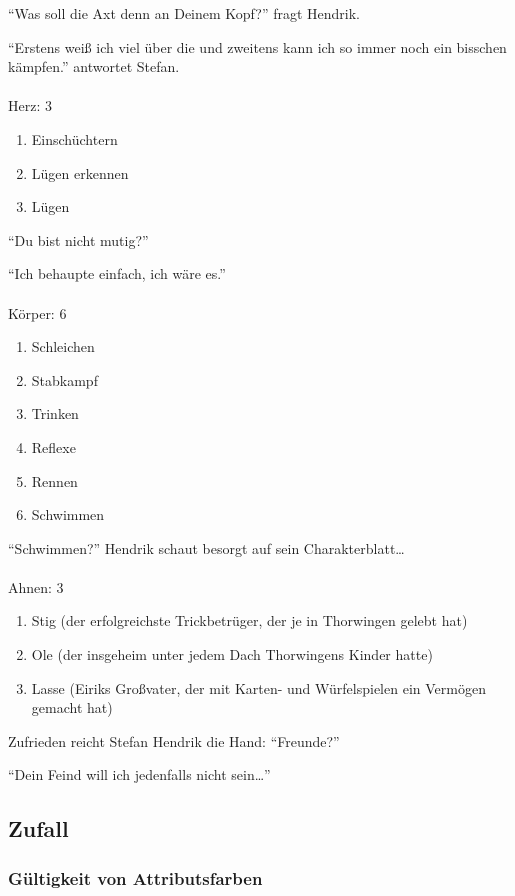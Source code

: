 "`Was soll die Axt denn an Deinem Kopf?"' fragt Hendrik. 

"`Erstens weiß ich viel über die und zweitens kann ich so immer noch ein bisschen kämpfen."' antwortet Stefan.
\\
\\
Herz: 3
\begin {enumerate}
\item Einschüchtern
\item Lügen erkennen
\item Lügen
\end {enumerate}

"`Du bist nicht mutig?"' 

"`Ich behaupte einfach, ich wäre es."'
\\
\\
Körper: 6
\begin {enumerate}
\item Schleichen
\item Stabkampf
\item Trinken
\item Reflexe
\item Rennen
\item Schwimmen
\end {enumerate}

"`Schwimmen?"' Hendrik schaut besorgt auf sein Charakterblatt\dots
\\
\\
Ahnen: 3
\begin {enumerate}
\item Stig (der erfolgreichste Trickbetrüger, der je in Thorwingen gelebt hat)
\item Ole (der insgeheim unter jedem Dach Thorwingens Kinder hatte)
\item Lasse (Eiriks Großvater, der mit Karten- und Würfelspielen ein Vermögen gemacht hat)
\end {enumerate}

Zufrieden reicht Stefan Hendrik die Hand:
"`Freunde?"' 

"`Dein Feind will ich jedenfalls nicht sein\dots"'


\subsection {Zufall}
\subsubsection {Gültigkeit von Attributsfarben}

